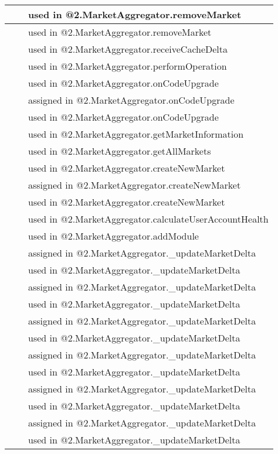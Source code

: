 \begin{tabular}{|l|l|p{5cm}|}
 & & used in @2.MarketAggregator.removeMarket\\\hline
 & & used in @2.MarketAggregator.removeMarket\\\hline
 & & used in @2.MarketAggregator.receiveCacheDelta\\\hline
 & & used in @2.MarketAggregator.performOperation\\\hline
 & & used in @2.MarketAggregator.onCodeUpgrade\\\hline
 & & assigned in @2.MarketAggregator.onCodeUpgrade\\\hline
 & & used in @2.MarketAggregator.onCodeUpgrade\\\hline
 & & used in @2.MarketAggregator.getMarketInformation\\\hline
 & & used in @2.MarketAggregator.getAllMarkets\\\hline
 & & used in @2.MarketAggregator.createNewMarket\\\hline
 & & assigned in @2.MarketAggregator.createNewMarket\\\hline
 & & used in @2.MarketAggregator.createNewMarket\\\hline
 & & used in @2.MarketAggregator.calculateUserAccountHealth\\\hline
 & & used in @2.MarketAggregator.addModule\\\hline
 & & assigned in @2.MarketAggregator.\_{}updateMarketDelta\\\hline
 & & used in @2.MarketAggregator.\_{}updateMarketDelta\\\hline
 & & assigned in @2.MarketAggregator.\_{}updateMarketDelta\\\hline
 & & used in @2.MarketAggregator.\_{}updateMarketDelta\\\hline
 & & assigned in @2.MarketAggregator.\_{}updateMarketDelta\\\hline
 & & used in @2.MarketAggregator.\_{}updateMarketDelta\\\hline
 & & assigned in @2.MarketAggregator.\_{}updateMarketDelta\\\hline
 & & used in @2.MarketAggregator.\_{}updateMarketDelta\\\hline
 & & assigned in @2.MarketAggregator.\_{}updateMarketDelta\\\hline
 & & used in @2.MarketAggregator.\_{}updateMarketDelta\\\hline
 & & assigned in @2.MarketAggregator.\_{}updateMarketDelta\\\hline
 & & used in @2.MarketAggregator.\_{}updateMarketDelta\\\hline

\end{tabular}
